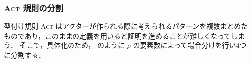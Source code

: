 \subsubsection{\textsc{Act} 規則の分割}

型付け規則 \textsc{Act} はアクターが作られる際に考えられるパターンを複数まとめたものであり，このままの定義を用いると証明を進めることが難しくなってしまう．
そこで，具体化のため， のように $\rho$ の要素数によって場合分けを行い4つに分割する．










